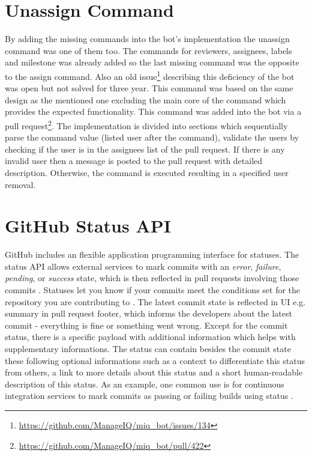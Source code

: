 \section{Unassign Command}

By adding the missing commands into the bot's implementation the unassign command was one of them too. The commands for reviewers, assignees, labels and milestone was already added so the last missing command was the opposite to the assign command. Also an old issue\footnote{\url{https://github.com/ManageIQ/miq_bot/issues/134}} describing this deficiency of the bot was open but not solved for three year. This command was based on the same design as the mentioned one excluding the main core of the command which provides the expected functionality. This command was added into the bot via a pull request\footnote{\url{https://github.com/ManageIQ/miq_bot/pull/422}}. The implementation is divided into sections which sequentially parse the command value (listed user after the command), validate the users by checking if the user is in the assignees list of the pull request. If there is any invalid user then a message is posted to the pull request with detailed description. Otherwise, the command is executed resulting in a specified user removal.

\section{GitHub Status API}

GitHub includes an flexible application programming interface for statuses. The status API allows external services to mark commits with an \textit{error}, \textit{failure}, \textit{pending}, or \textit{success} state, which is then reflected in pull requests involving those commits \cite{GITHUB_STATUS_API}. Statuses let you know if your commits meet the conditions set for the repository you are contributing to \cite{GITHUB_ABOUT_STATUSES}. The latest commit state is reflected in UI e.g. summary in pull request footer, which informs the developers about the latest commit - everything is fine or something went wrong. Except for the commit status, there is a specific payload with additional information which helps with supplementary informations. The status can contain besides the commit state these following optional informations such as a context to differentiate this status from others, a link to more details about this status and a short human-readable description of this status. As an example, one common use is for continuous integration services to mark commits as passing or failing builds using status \cite{GITHUB_STATUS_API}.

